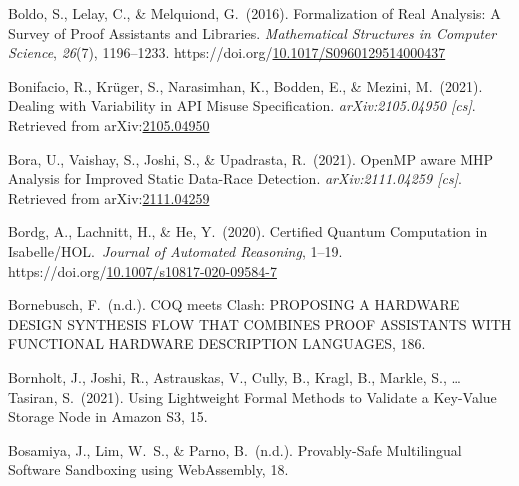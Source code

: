 \documentclass[12pt,twoside]{article}
\begin{document}
{\begin{thebibliography}{1079}
\mdbibitemlabel{}Boldo, S., Lelay, C., \& Melquiond, G.~(2016). Formalization of Real Analysis: A Survey of Proof Assistants and Libraries. \emph{Mathematical Structures in Computer Science}, \emph{26}(7), 1196–1233. https://doi.org/\href{https://dx.doi.org/10.1017/S0960129514000437}{10.1017/S0960129514000437}%

\mdbibitemlabel{}Bonifacio, R., Krüger, S., Narasimhan, K., Bodden, E., \& Mezini, M.~(2021). Dealing with Variability in API Misuse Specification. \emph{arXiv:2105.04950 {}[cs]}. Retrieved from arXiv:\href{http://arxiv.org/abs/2105.04950}{2105.04950}%

\mdbibitemlabel{}Bora, U., Vaishay, S., Joshi, S., \& Upadrasta, R.~(2021). OpenMP aware MHP Analysis for Improved Static Data-Race Detection. \emph{arXiv:2111.04259 {}[cs]}. Retrieved from arXiv:\href{http://arxiv.org/abs/2111.04259}{2111.04259}%

\mdbibitemlabel{}Bordg, A., Lachnitt, H., \& He, Y.~(2020). Certified Quantum Computation in Isabelle/HOL.~\emph{Journal of Automated Reasoning}, 1–19. https://doi.org/\href{https://dx.doi.org/10.1007/s10817-020-09584-7}{10.1007/s10817-020-09584-7}%

\mdbibitemlabel{}Bornebusch, F.~(n.d.). COQ meets Clash: PROPOSING A HARDWARE DESIGN SYNTHESIS FLOW THAT COMBINES PROOF ASSISTANTS WITH FUNCTIONAL HARDWARE DESCRIPTION LANGUAGES, 186.%

\mdbibitemlabel{}Bornholt, J., Joshi, R., Astrauskas, V., Cully, B., Kragl, B., Markle, S., … Tasiran, S.~(2021). Using Lightweight Formal Methods to Validate a Key-Value Storage Node in Amazon S3, 15.%

\mdbibitemlabel{}Bosamiya, J., Lim, W.~S., \& Parno, B.~(n.d.). Provably-Safe Multilingual Software Sandboxing using WebAssembly, 18.%


\end{thebibliography}}
\end{document}
